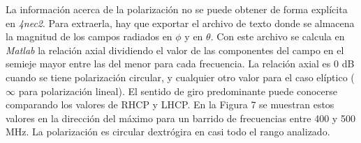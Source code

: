 \documentclass[12pt]{article}
\begin{document}
La información acerca de la polarización no se puede obtener de forma explícita en \textit{4nec2}. Para extraerla, hay que exportar el archivo de texto donde se almacena la magnitud de los campos radiados en $\phi$ y en $\theta$. Con este archivo se calcula en \textit{Matlab} la relación axial dividiendo el valor de las componentes del campo en el semieje mayor entre las del menor para cada frecuencia. La relación axial es 0 dB cuando se tiene polarización circular, y cualquier otro valor para el caso elíptico ($\infty$ para polarización lineal). El sentido de giro predominante puede conocerse comparando los valores de RHCP y LHCP. En la Figura 7 se muestran estos valores en la dirección del máximo para un barrido de frecuencias entre 400 y 500 MHz. La polarización es circular dextrógira en casi todo el rango analizado.\\
\end{document}
